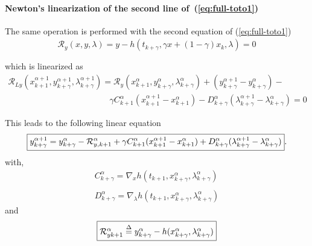  \paragraph{Newton's linearization of the second  line of~(\ref{eq:full-toto1})}
The same operation is performed with the second equation of (\ref{eq:full-toto1})
\begin{equation}
  \begin{array}{l}
    \mathcal R_y(x,y,\lambda)=y-h(t_{k+\gamma},\gamma x + (1-\gamma) x_k ,\lambda) =0\\ \\
  \end{array}
\end{equation}
which is linearized as
\begin{equation}
  \label{eq:full-NL9}
  \begin{array}{l}
    \mathcal R_{Ly}(x^{\alpha+1}_{k+1},y^{\alpha+1}_{k+\gamma},\lambda^{\alpha+1}_{k+\gamma}) = \mathcal
    R_{y}(x^{\alpha}_{k+1},y^{\alpha}_{k+\gamma},\lambda^{\alpha}_{k+\gamma}) +
    (y^{\alpha+1}_{k+\gamma}-y^{\alpha}_{k+\gamma})- \\[2mm] \qquad  \qquad \qquad \qquad  \qquad \qquad
    \gamma C^{\alpha}_{k+1}(x^{\alpha+1}_{k+1}-x^{\alpha}_{k+1}) - D^{\alpha}_{k+\gamma}(\lambda^{\alpha+1}_{k+\gamma}-\lambda^{\alpha}_{k+\gamma})=0
  \end{array}
\end{equation}

This leads to the following linear equation
\begin{equation}
  \boxed{y^{\alpha+1}_{k+\gamma} =  y^{\alpha}_{k+\gamma}
  -\mathcal R^{\alpha}_{y,k+1}+ \\
  \gamma C^{\alpha}_{k+1}(x^{\alpha+1}_{k+1}-x^{\alpha}_{k+1}) +
  D^{\alpha}_{k+\gamma}(\lambda^{\alpha+1}_{k+\gamma}-\lambda^{\alpha}_{k+\gamma})}. \label{eq:full-NL11y}
\end{equation}
with,
\begin{equation}
     \begin{array}{l}
  C^{\alpha}_{k+\gamma} = \nabla_xh(t_{k+1}, x^{\alpha}_{k+\gamma},\lambda^{\alpha}_{k+\gamma} ) \\ \\
  D^{\alpha}_{k+\gamma} = \nabla_{\lambda}h(t_{k+1}, x^{\alpha}_{k+\gamma},\lambda^{\alpha}_{k+\gamma})
 \end{array}
\end{equation}
and
\begin{equation}\fbox{$
\mathcal R^{\alpha}_{yk+1} \stackrel{\Delta}{=} y^{\alpha}_{k+\gamma} - h(x^{\alpha}_{k+\gamma},\lambda^{\alpha}_{k+\gamma})$}
 \end{equation}
